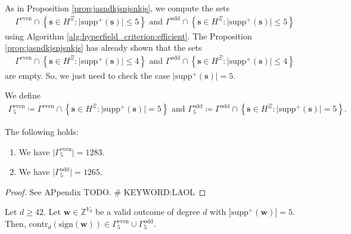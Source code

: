 As in Proposition \ref{prop:jasndkjsnjsnkjs}, we compute the sets 
\begin{gather*}
    \Gamma^{\mathrm{even}} \cap \left\{ \mathbf{s} \in H^{\Xi} : \lvert \mathrm{supp}^+(\mathbf{s}) \rvert \leq 5 \right\} \text{ and }
    \Gamma^{\mathrm{odd}} \cap \left\{ \mathbf{s} \in H^{\Xi} : \lvert \mathrm{supp}^+(\mathbf{s}) \rvert \leq 5 \right\} 
\end{gather*}
using Algorithm \ref{alg:hyperfield_criterion:efficient}. The Proposition \ref{prop:jasndkjsnjsnkjs} has already shown that the sets 
\begin{align*}
    \Gamma^{\mathrm{even}} \cap \left\{ \mathbf{s} \in H^{\Xi} : \lvert \mathrm{supp}^+(\mathbf{s}) \rvert \leq 4 \right\} \text{ and }
    \Gamma^{\mathrm{odd}} \cap \left\{ \mathbf{s} \in H^{\Xi} : \lvert \mathrm{supp}^+(\mathbf{s}) \rvert \leq 4 \right\} 
\end{align*}
are empty. So, we just need to check the case \( \lvert \mathrm{supp}^+(\mathbf{s}) \rvert = 5 \).



\begin{definition}
    We define 
    \begin{gather*}
        \Gamma^{\mathrm{even}}_5 \coloneqq \Gamma^{\mathrm{even}} \cap \left\{ \mathbf{s} \in H^{\Xi} : \lvert \mathrm{supp}^+(\mathbf{s}) \rvert = 5 \right\}
        \text{ and }
        \Gamma^{\mathrm{odd}}_5 \coloneqq \Gamma^{\mathrm{odd}} \cap \left\{ \mathbf{s} \in H^{\Xi} : \lvert \mathrm{supp}^+(\mathbf{s}) \rvert = 5 \right\}.
    \end{gather*}
\end{definition}

\begin{proposition}
    The following holds:
    \begin{enumerate}
        \item We have \( \lvert \Gamma^{\mathrm{even}}_5 \rvert  = 1283\).
        \item We have \( \lvert \Gamma^{\mathrm{odd}}_5 \rvert  = 1265\).
    \end{enumerate}
\end{proposition}

\begin{proof}
    See APpendix TODO. \# KEYWORD:LAOL
\end{proof}

\begin{corollary}
    Let \( d\geq 42 \). Let \( \mathbf{w} \in \mathbb{Z}^{V_d} \) be a valid outcome of degree \( d \) with \( |\mathrm{supp}^+(\mathbf w)| = 5 \). Then, \( \mathrm{contr}_d(\mathrm{sign}(\mathbf{w})) \in \Gamma^{\mathrm{even}}_5 \cup \Gamma^{\mathrm{odd}}_5 \).
\end{corollary}


